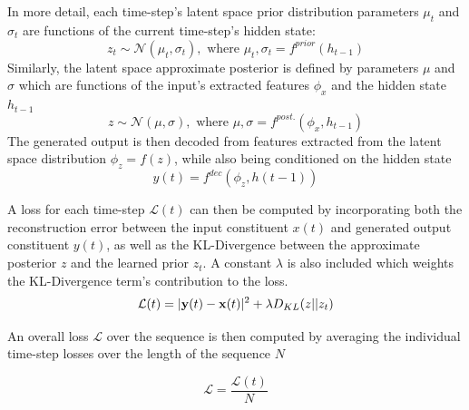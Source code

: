 \documentclass[12pt, a4paper]{article}
\begin{document}
In more detail, each time-step's latent space prior distribution parameters $\mu_{t}$ and $\sigma_{t}$ are functions of the current time-step's hidden state:
\begin{equation}
	z_{t} \sim \mathcal{N}(\mu_{t}, \sigma_{t}), \text{ where } \mu_{t}, \sigma_{t} = f^{prior}(h_{t-1})
\end{equation} 
Similarly, the latent space approximate posterior is defined by parameters $\mu$ and $\sigma$ which are functions of the input's extracted features $\phi_{x}$ and the hidden state $h_{t-1}$
\begin{equation}
	z \sim \mathcal{N}(\mu, \sigma), \text{ where } \mu, \sigma = f^{post.}(\phi_{x}, h_{t-1})
\end{equation} 
The generated output is then decoded from features extracted from the latent space distribution $\phi_{z} = f(z)$, while also being conditioned on the hidden state
\begin{equation}
y(t) = f^{dec}(\phi_{z}, h(t-1))
\end{equation} 

A loss for each time-step $\mathcal{L}(t)$ can then be computed by incorporating both the reconstruction error between the input constituent $x(t)$ and generated output constituent $y(t)$, as well as the KL-Divergence between the approximate posterior $z$ and the learned prior $z_{t}$. A constant $\lambda$ is also included which weights the KL-Divergence term's contribution to the loss. 
\begin{equation}
\mathcal{L}(t) = |{\bf y}(t) - {\bf x}(t)|^{2} + \lambda D_{KL}(z||z_{t})
\end{equation} 

An overall loss $\mathcal{L}$ over the sequence is then computed by averaging the individual time-step losses over the length of the sequence $N$

\begin{equation}
\mathcal{L} = \frac{\mathcal{L}(t)}{N}
\end{equation} 
\end{document}
